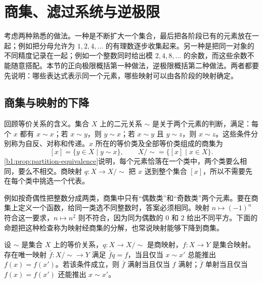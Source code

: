 
\section{商集、滤过系统与逆极限}
\label{b1:sec:A02}

考虑两种熟悉的做法。一种是不断扩大一个集合，最后把各阶段已有的元素放在一起；例如把分母允许为 \(1,2,4,\ldots\) 的有理数逐步收集起来。另一种是把同一对象的不同精度记录在一起；例如一个整数同时给出模 \(2,4,8,\ldots\) 的余数，而这些余数不能随意搭配。本节的正向极限概括第一种做法，逆极限概括第二种做法。两者都要先说明：哪些表达式表示同一个元素，哪些映射可以由各阶段的映射确定。

\subsection{商集与映射的下降}
\label{b1:subsec:A02:01}

回顾等价关系的含义。集合 \(X\) 上的二元关系 \(\sim\) 是关于两个元素的判断，满足：每个 \(x\) 都有 \(x\sim x\)；若 \(x\sim y\)，则 \(y\sim x\)；若 \(x\sim y\) 且 \(y\sim z\)，则 \(x\sim z\)。这些条件分别称为自反、对称和传递。\(x\) 所在的等价类及全部等价类组成的商集为
\[
	[x]=\{y\in X\mid y\sim x\},\qquad X/{\sim}=\{[x]\mid x\in X\}.
\]
\cref{b1:prop:partition-equivalence}说明，每个元素恰落在一个类中，两个类要么相同，要么不相交。商映射 \(q:X\to X/{\sim}\) 把 \(x\) 送到整个集合 \([x]\)，所以不需要先在每个类中挑选一个代表。

\ProseParagraphBreak
例如按奇偶性把整数分成两类，商集中只有“偶数类”和“奇数类”两个元素。要在商集上定义一个函数，给同一类选不同整数时，答案必须相同。映射 \(n\mapsto(-1)^n\) 符合这一要求，\(n\mapsto n^2\) 则不符合，因为同为偶数的 \(0\) 和 \(2\) 给出不同平方。下面的命题把这种检查称为映射经商集的分解，也常说映射能够下降到商集。

\begin{proposition}\label{b1:prop:set-quotient-universal}
	设 \(\sim\) 是集合 \(X\) 上的等价关系，\(q:X\rightarrow X/{\sim}\) 是商映射，\(f:X\rightarrow Y\) 是集合映射。存在唯一映射 \(\bar f:X/{\sim}\rightarrow Y\) 满足 \(\bar f q=f\)，当且仅当 \(x\sim x'\) 总能推出 \(f(x)=f(x')\)。若该条件成立，则 \(\bar f\) 满射当且仅当 \(f\) 满射；\(\bar f\) 单射当且仅当 \(f(x)=f(x')\) 还能推出 \(x\sim x'\)。
\end{proposition}

